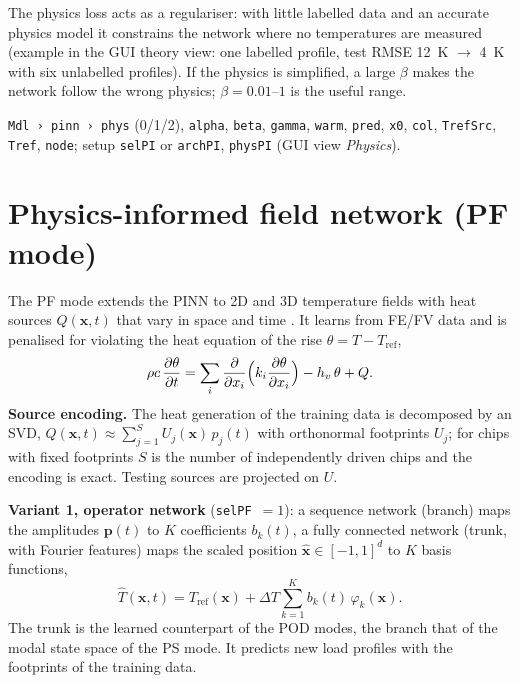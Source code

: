 \documentclass[11pt,a4paper]{article}
\newcommand{\cfg}[1]{\texttt{#1}}
\begin{document}
\begin{keybox}
The physics loss acts as a regulariser: with little labelled data and an accurate physics model it constrains the
network where no temperatures are measured (example in the GUI theory view: one labelled profile, test RMSE
\SI{12}{\kelvin} $\to$ \SI{4}{\kelvin} with six unlabelled profiles). If the physics is simplified, a large $\beta$
makes the network follow the wrong physics; $\beta=0.01$--$1$ is the useful range.
\end{keybox}

\begin{cfgbox}
\cfg{Mdl › pinn › phys} (0/1/2), \cfg{alpha}, \cfg{beta}, \cfg{gamma}, \cfg{warm}, \cfg{pred}, \cfg{x0}, \cfg{col},
\cfg{TrefSrc}, \cfg{Tref}, \cfg{node}; setup \cfg{selPI} or \cfg{archPI}, \cfg{physPI} (GUI view \emph{Physics}).
\end{cfgbox}

\section{Physics-informed field network (PF mode)}\label{sec:pf}
The PF mode extends the PINN to 2D and 3D temperature fields with heat sources $Q(\bm x,t)$ that vary in space and
time \cite{cai,raissi}. It learns from FE/FV data and is penalised for violating the heat equation of the rise
$\theta=T-T_{\mathrm{ref}}$,
\begin{equation}
  \rho c\,\frac{\partial\theta}{\partial t}=\sum_i\frac{\partial}{\partial x_i}\Bigl(k_i\frac{\partial\theta}
  {\partial x_i}\Bigr)-h_v\,\theta+Q .
\end{equation}
\textbf{Source encoding.} The heat generation of the training data is decomposed by an SVD,
$Q(\bm x,t)\approx\sum_{j=1}^{S}U_j(\bm x)\,p_j(t)$ with orthonormal footprints $U_j$; for chips with fixed footprints
$S$ is the number of independently driven chips and the encoding is exact. Testing sources are projected on $U$.

\textbf{Variant 1, operator network} \cite{lu} (\cfg{selPF}~$=1$): a sequence network (branch) maps the amplitudes
$\bm p(t)$ to $K$ coefficients $b_k(t)$, a fully connected network (trunk, with Fourier features) maps the scaled
position $\hat{\bm x}\in[-1,1]^d$ to $K$ basis functions,
\begin{equation}
  \hat T(\bm x,t)=T_{\mathrm{ref}}(\bm x)+\Delta T\sum_{k=1}^{K}b_k(t)\,\varphi_k(\bm x).
\end{equation}
The trunk is the learned counterpart of the POD modes, the branch that of the modal state space of the PS mode. It
predicts new load profiles with the footprints of the training data.
\end{document}
